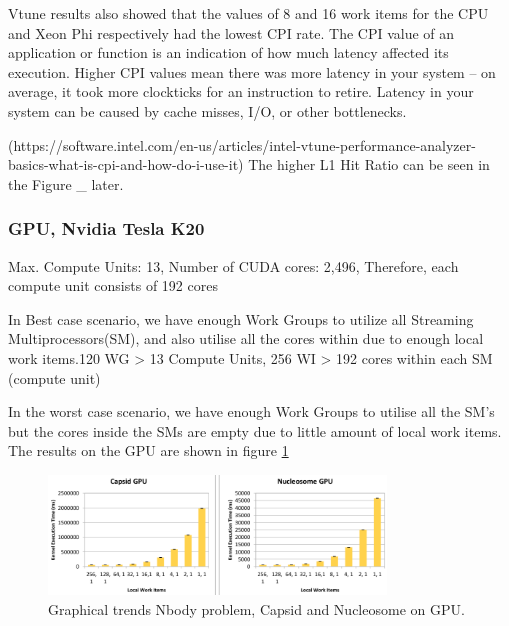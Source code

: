 \par{Vtune results also showed that the values of 8 and 16 work items for the CPU and 
    Xeon Phi respectively had the lowest CPI rate. The CPI value of an application or 
    function is an indication of how much latency affected its execution. 
    Higher CPI values mean there was more latency in your system – on average, 
    it took more clockticks for an instruction to retire. 
    Latency in your system can be caused by cache misses, I/O, or other bottlenecks.}

\par{{\color{red}
    (https://software.intel.com/en-us/articles/intel-vtune-performance-analyzer-basics-what-is-cpi-and-how-do-i-use-it) 
    The higher L1 Hit Ratio can be seen in the Figure \_ later.}}

\subsubsection{GPU, Nvidia Tesla K20}
\par{{\color{red}Max. Compute Units: 13, Number of CUDA cores: 2,496, Therefore, each compute unit consists of 192 cores}}

\par{In Best case scenario, we have enough Work Groups to utilize all Streaming Multiprocessors(SM), 
    and also utilise all the cores within due to enough local work items.{\color{red}120 WG > 13 Compute Units,
    256 WI > 192 cores within each SM (compute unit)}}

\par{In the worst case scenario, we have enough Work Groups to utilise all the SM's 
    but the cores inside the SMs are empty due to little amount of local work items.{\color{red}
    The results on the GPU are shown in figure \ref{nbody_gpu}}}

\begin{figure}[!h]
    \centering
    \includegraphics[width=0.8\textwidth]{figures/nbody_gpu.png}
    \caption{Graphical trends Nbody problem, Capsid and Nucleosome on GPU.}
    \label{nbody_gpu}
\end{figure}
        
